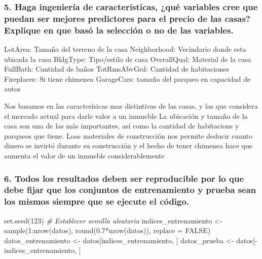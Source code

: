 \documentclass[
]{article}
\newenvironment{Shaded}{\begin{snugshade}}{\end{snugshade}}
\newcommand{\AttributeTok}[1]{\textcolor[rgb]{0.77,0.63,0.00}{#1}}
\newcommand{\CommentTok}[1]{\textcolor[rgb]{0.56,0.35,0.01}{\textit{#1}}}
\newcommand{\ConstantTok}[1]{\textcolor[rgb]{0.00,0.00,0.00}{#1}}
\newcommand{\DecValTok}[1]{\textcolor[rgb]{0.00,0.00,0.81}{#1}}
\newcommand{\FloatTok}[1]{\textcolor[rgb]{0.00,0.00,0.81}{#1}}
\newcommand{\FunctionTok}[1]{\textcolor[rgb]{0.00,0.00,0.00}{#1}}
\newcommand{\NormalTok}[1]{#1}
\newcommand{\OtherTok}[1]{\textcolor[rgb]{0.56,0.35,0.01}{#1}}
\newcommand{\SpecialCharTok}[1]{\textcolor[rgb]{0.00,0.00,0.00}{#1}}
\begin{document}
\hypertarget{haga-ingenieruxeda-de-caracteruxedsticas-quuxe9-variables-cree-que-puedan-ser-mejores-predictores-para-el-precio-de-las-casas-explique-en-que-basuxf3-la-selecciuxf3n-o-no-de-las-variables.}{%
\subsubsection{5. Haga ingeniería de características, ¿qué variables
cree que puedan ser mejores predictores para el precio de las casas?
Explique en que basó la selección o no de las
variables.}\label{haga-ingenieruxeda-de-caracteruxedsticas-quuxe9-variables-cree-que-puedan-ser-mejores-predictores-para-el-precio-de-las-casas-explique-en-que-basuxf3-la-selecciuxf3n-o-no-de-las-variables.}}

LotArea: Tamaño del terreno de la casa Neighborhood: Vecindario donde
esta ubicada la casa BldgType: Tipo/estilo de casa OverallQual: Material
de la casa FullBath: Cantidad de baños TotRmsAbvGrd: Cantidad de
habitaciones Fireplaces: Si tiene chimenea GarageCars: tamaño del
parqueo en capacidad de autos

Nos basamos en las caracterísicas mas distintivas de las casas, y las
que considera el mercado actual para darle valor a un inmueble La
ubicación y tamaño de la casa son una de las más importantes, así como
la cantidad de habitacions y parqueos que tiene. Loas materiales de
construcción nos permite deducir cuanto dinero se invirtó durante su
construcción y el hecho de tener chimenea hace que aumenta el valor de
un inmueble considerablemente

\hypertarget{todos-los-resultados-deben-ser-reproducible-por-lo-que-debe-fijar-que-los-conjuntos-de-entrenamiento-y-prueba-sean-los-mismos-siempre-que-se-ejecute-el-cuxf3digo.}{%
\subsubsection{6. Todos los resultados deben ser reproducible por lo que
debe fijar que los conjuntos de entrenamiento y prueba sean los mismos
siempre que se ejecute el
código.}\label{todos-los-resultados-deben-ser-reproducible-por-lo-que-debe-fijar-que-los-conjuntos-de-entrenamiento-y-prueba-sean-los-mismos-siempre-que-se-ejecute-el-cuxf3digo.}}

\begin{Shaded}
\begin{Highlighting}[]
\FunctionTok{set.seed}\NormalTok{(}\DecValTok{123}\NormalTok{) }\CommentTok{\# Establecer semilla aleatoria}
\NormalTok{indices\_entrenamiento }\OtherTok{\textless{}{-}} \FunctionTok{sample}\NormalTok{(}\DecValTok{1}\SpecialCharTok{:}\FunctionTok{nrow}\NormalTok{(datos), }\FunctionTok{round}\NormalTok{(}\FloatTok{0.7}\SpecialCharTok{*}\FunctionTok{nrow}\NormalTok{(datos)), }\AttributeTok{replace =} \ConstantTok{FALSE}\NormalTok{)}
\NormalTok{datos\_entrenamiento }\OtherTok{\textless{}{-}}\NormalTok{ datos[indices\_entrenamiento, ]}
\NormalTok{datos\_prueba }\OtherTok{\textless{}{-}}\NormalTok{ datos[}\SpecialCharTok{{-}}\NormalTok{indices\_entrenamiento, ]}
\end{Highlighting}
\end{Shaded}
\end{document}
